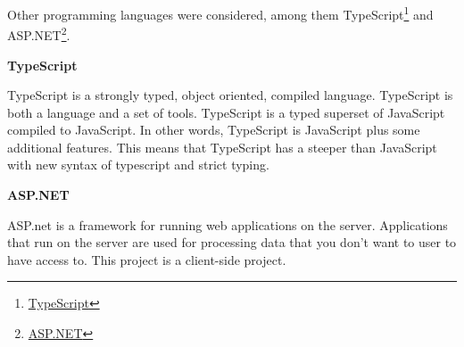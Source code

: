 Other programming languages were considered, among them TypeScript\footnote{\href{https://www.typescriptlang.org/}{TypeScript}\label{typescript}} and ASP.NET\footnote{\href{https://dotnet.microsoft.com/apps/aspnet}{ASP.NET}\label{asp.net}}.

\bigskip
\centerline{\textbf{TypeScript}}
\medskip

TypeScript is a strongly typed, object oriented, compiled language. TypeScript is both a language and a set of tools. TypeScript is a typed superset of JavaScript compiled to JavaScript. In other words, TypeScript is JavaScript plus some additional features. This means that TypeScript has a steeper than JavaScript with new syntax of typescript and strict typing.

\bigskip
\centerline{\textbf{ASP.NET}}
\medskip

ASP.net is a framework for running web applications on the server. Applications that run on the server are used for processing data that you don't want to user to have access to. This project is a client-side project.







